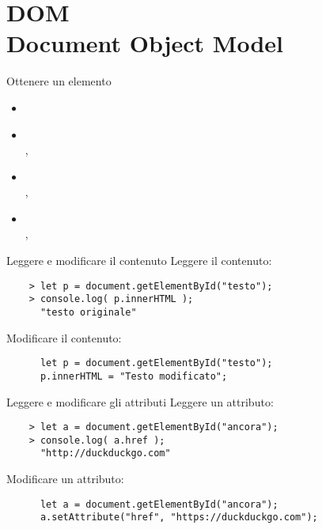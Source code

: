 \section[DOM]{DOM\\Document Object Model}
\begin{frame}{Ottenere un elemento}\transfade\centering
  \begin{itemize}
    \item{}\\\smallskip
      \bigskip
    \item{}\\\smallskip
      , \bigskip
    \item{}\\\smallskip
      , \bigskip
    \item{}\\\smallskip
      , 
  \end{itemize}
\end{frame}

\begin{frame}[fragile]{Leggere e modificare il contenuto}\transfade\centering
  Leggere il contenuto:
  \begin{verbatim}
    > let p = document.getElementById("testo");
    > console.log( p.innerHTML );
      "testo originale"
  \end{verbatim}
  \pause\bigskip
  Modificare il contenuto:
  \begin{verbatim}
      let p = document.getElementById("testo");
      p.innerHTML = "Testo modificato";
  \end{verbatim}
\end{frame}

\begin{frame}[fragile]{Leggere e modificare gli attributi}\transfade\centering
  Leggere un attributo:
  \begin{verbatim}
    > let a = document.getElementById("ancora");
    > console.log( a.href );
      "http://duckduckgo.com"
  \end{verbatim}
  \pause\bigskip
  Modificare un attributo:
  \begin{verbatim}
      let a = document.getElementById("ancora");
      a.setAttribute("href", "https://duckduckgo.com");
  \end{verbatim}
\end{frame}

